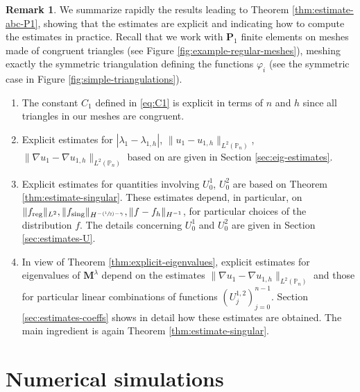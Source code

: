 \documentclass[JEP,XML,SOM,Unicode,ThmDefs,NoFloatCountersInSection,published]{cedram}
\newcommand{\Psfrac}[2]{(\sfrac{#1}{#2})}
\theoremstyle{plain}
\theoremstyle{definition}
\newtheorem{rem}[thm]{Remark}
\newcommand{\bo}[1]{{\boldsymbol#1}}
\newcommand{\reg}{\textup{reg}}
\newcommand{\sing}{\textup{sing}}
\def\Pp{{\mathbb{P}_n}}
\begin{document}
\begin{rem}
We summarize rapidly the results leading to Theorem \ref{thm:estimate-abc-P1}, showing that the estimates are explicit and indicating how to compute the estimates in practice. Recall that we work with $\bo P_1$ finite elements on meshes made of congruent triangles (see Figure \ref{fig:example-regular-meshes}), meshing exactly the symmetric triangulation defining the functions $\varphi_i$ (see the symmetric case in Figure \ref{fig:simple-triangulations}).

\begin{enumerate}
\item
The constant $C_1$ defined in \eqref{eq:C1} is explicit in terms of $n$ and $h$ since all triangles in our meshes are congruent.

\item
Explicit estimates for $|\lambda_1-\lambda_{1,h}|$, $\|u_1-u_{1,h}\|_{L^2(\Pp)}$, $\|\nabla u_1-\nabla u_{1,h}\|_{L^2(\Pp)}$ based on \cite{LiOi13} are given in Section \ref{sec:eig-estimates}.

\item
Explicit estimates for quantities involving $U_0^1$, $U_0^2$ are based on Theorem \ref{thm:estimate-singular}. These estimates depend, in particular, on $\|f_{\reg}\|_{L^2}, \|f_{\sing}\|_{H^{-\Psfrac{1}{2}-\gamma}}, \|f-f_h\|_{H^{-1}}$, for particular choices of the distribution $f$. The details concerning $U_0^1$ and $U_0^2$ are given in Section \ref{sec:estimates-U}.

\item
In view of Theorem \ref{thm:explicit-eigenvalues}, explicit estimates for eigenvalues of $\bo M^\lambda$ depend on the estimates $\|\nabla u_1-\nabla u_{1,h}\|_{L^2(\Pp)}$ and those for particular linear combinations of functions $(U_j^{1,2})_{j=0}^{n-1}$. Section \ref{sec:estimates-coeffs} shows in detail how these estimates are obtained. The main ingredient is again Theorem \ref{thm:estimate-singular}.
\end{enumerate}
\end{rem}

\section{Numerical simulations}\label{bobu200.s6}
\end{document}
